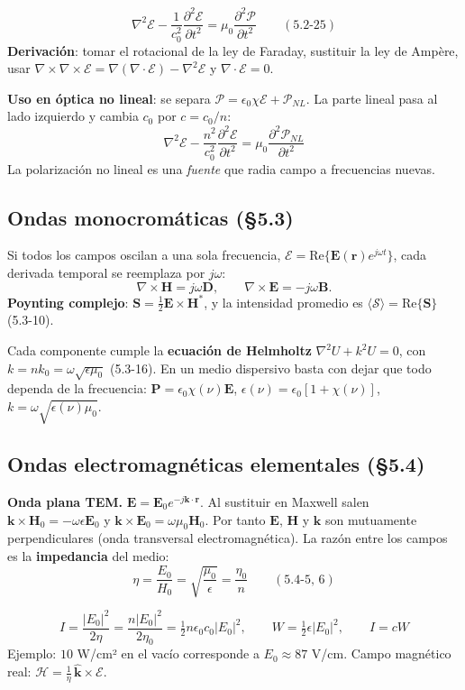 \documentclass[10pt]{article}
\newcommand{\Ec}{\boldsymbol{\mathcal E}}
\newcommand{\Hc}{\boldsymbol{\mathcal H}}
\newcommand{\Pc}{\boldsymbol{\mathcal P}}
\newcommand{\Sc}{\boldsymbol{\mathcal S}}
\newcommand{\E}{\mathbf E}
\newcommand{\Hv}{\mathbf H}
\newcommand{\D}{\mathbf D}
\newcommand{\kv}{\mathbf k}
\newcommand{\rv}{\mathbf r}
\begin{document}
\begin{clave}[title={Ecuación de onda general (medio homogéneo e isótropo, lineal o no, dispersivo o no)}]
\[
\nabla^2\Ec-\frac{1}{c_0^2}\frac{\partial^2\Ec}{\partial t^2}=\mu_0\frac{\partial^2\Pc}{\partial t^2}\qquad(5.2\text{-}25)
\]
\textbf{Derivación}: tomar el rotacional de la ley de Faraday, sustituir la ley de Ampère, usar $\nabla\times\nabla\times\Ec=\nabla(\nabla\cdot\Ec)-\nabla^2\Ec$ y $\nabla\cdot\Ec=0$.

\textbf{Uso en óptica no lineal}: se separa $\Pc=\epsilon_0\chi\Ec+\Pc_{NL}$. La parte lineal pasa al lado izquierdo y cambia $c_0$ por $c=c_0/n$:
\[
\nabla^2\Ec-\frac{n^2}{c_0^2}\frac{\partial^2\Ec}{\partial t^2}=\mu_0\frac{\partial^2\Pc_{NL}}{\partial t^2}
\]
La polarización no lineal es una \emph{fuente} que radia campo a frecuencias nuevas.
\end{clave}

\subsection{Ondas monocromáticas (§5.3)}
Si todos los campos oscilan a una sola frecuencia, $\Ec=\mathrm{Re}\{\E(\rv)e^{j\omega t}\}$, cada derivada temporal se reemplaza por $j\omega$:
\[
\nabla\times\Hv=j\omega\D,\qquad \nabla\times\E=-j\omega\mathbf B .
\]
\textbf{Poynting complejo}: $\mathbf S=\tfrac12\E\times\Hv^*$, y la intensidad promedio es $\langle\Sc\rangle=\mathrm{Re}\{\mathbf S\}$ (5.3-10).

Cada componente cumple la \textbf{ecuación de Helmholtz} $\nabla^2U+k^2U=0$, con $k=nk_0=\omega\sqrt{\epsilon\mu_0}$ (5.3-16). En un medio dispersivo basta con dejar que todo dependa de la frecuencia: $\mathbf P=\epsilon_0\chi(\nu)\E$, $\epsilon(\nu)=\epsilon_0[1+\chi(\nu)]$, $k=\omega\sqrt{\epsilon(\nu)\mu_0}$.

\subsection{Ondas electromagnéticas elementales (§5.4)}
\textbf{Onda plana TEM.} $\E=\E_0e^{-j\kv\cdot\rv}$. Al sustituir en Maxwell salen $\kv\times\Hv_0=-\omega\epsilon\E_0$ y $\kv\times\E_0=\omega\mu_0\Hv_0$. Por tanto $\E$, $\Hv$ y $\kv$ son mutuamente perpendiculares (onda transversal electromagnética). La razón entre los campos es la \textbf{impedancia} del medio:
\[
\eta=\frac{E_0}{H_0}=\sqrt{\frac{\mu_0}{\epsilon}}=\frac{\eta_0}{n}\qquad(5.4\text{-}5,\,6)
\]

\begin{clave}[title={Intensidad y energía de una onda plana (5.4-8 a 5.4-10)}]
\[
I=\frac{|E_0|^2}{2\eta}=\frac{n|E_0|^2}{2\eta_0}=\tfrac12 n\epsilon_0c_0|E_0|^2,\qquad W=\tfrac12\epsilon|E_0|^2,\qquad I=cW
\]
Ejemplo: $10$ W/cm² en el vacío corresponde a $E_0\approx87$ V/cm. Campo magnético real: $\Hc=\frac1{\eta}\,\hat{\kv}\times\Ec$.
\end{clave}
\end{document}
